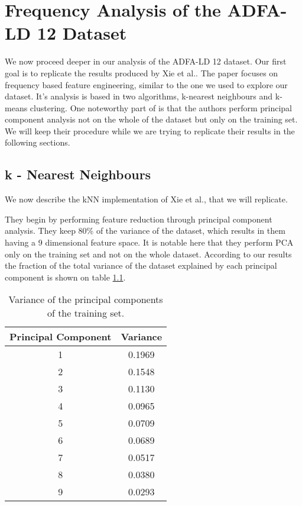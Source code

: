 \documentclass[reqno,openany,12pt]{amsbook}
\begin{document}
\chapter{Frequency Analysis of the ADFA-LD 12 Dataset}

We now proceed deeper in our analysis of the ADFA-LD 12 dataset. Our first goal is to replicate the results produced by Xie et al.\cite{adf1}. The paper focuses on frequency based feature engineering, similar to the one we used to explore our dataset. It's analysis is based in two algorithms, k-nearest neighbours and k-means clustering. One noteworthy part of \cite{adf1} is that the authors perform principal component analysis not on the whole of the dataset but only on the training set.
We will keep their procedure while we are trying to replicate their results in the following sections.

\section{k - Nearest Neighbours}

We now describe the kNN implementation of Xie et al.\cite{adf1}, that we will replicate. 

They begin by performing feature reduction through principal component analysis. They keep 80\% of the variance of the dataset, which results in them having a 9 dimensional feature space. It is notable here that they perform PCA only on the training set and not on the whole dataset.
According to our results the fraction of the total variance of the dataset explained by each principal component is shown on table \ref{knnt1}.
\begin{table}
\begin{tabular}{|c|c|}
\hline
Principal Component &  Variance \\ \hline 
1 & 0.1969 \\ \hline
2 & 0.1548 \\ \hline
3 & 0.1130 \\ \hline
4 & 0.0965 \\ \hline
5 & 0.0709 \\ \hline
6 & 0.0689 \\ \hline
7 & 0.0517 \\ \hline
8 & 0.0380 \\ \hline
9 & 0.0293 \\ \hline
\end{tabular}
\vspace{5pt}
\caption{Variance of the principal components of the training set.}
\label{knnt1}
\end{table}
\end{document}
